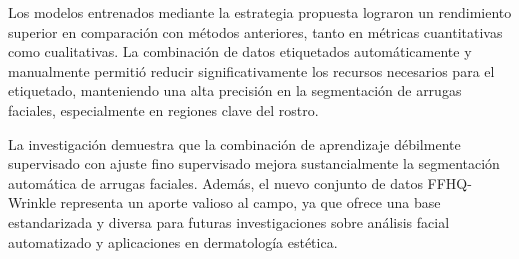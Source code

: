 Los modelos entrenados mediante la estrategia propuesta lograron un rendimiento superior en comparación con métodos anteriores, tanto en métricas cuantitativas como cualitativas. La combinación de datos etiquetados automáticamente y manualmente permitió reducir significativamente los recursos necesarios para el etiquetado, manteniendo una alta precisión en la segmentación de arrugas faciales, especialmente en regiones clave del rostro.

La investigación demuestra que la combinación de aprendizaje débilmente supervisado con ajuste fino supervisado mejora sustancialmente la segmentación automática de arrugas faciales. Además, el nuevo conjunto de datos FFHQ-Wrinkle representa un aporte valioso al campo, ya que ofrece una base estandarizada y diversa para futuras investigaciones sobre análisis facial automatizado y aplicaciones en dermatología estética.


